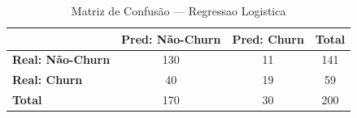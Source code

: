 \begin{table}[htbp]
\centering
\caption{Matriz de Confusão — Regressao Logistica}
\label{tab:matriz}
\small
\begin{tabular}{lcc|c}
\toprule
& \textbf{Pred: Não-Churn} & \textbf{Pred: Churn} & \textbf{Total} \\
\midrule
\textbf{Real: Não-Churn} & 130 & 11 & 141 \\
\textbf{Real: Churn} & 40 & 19 & 59 \\
\midrule
\textbf{Total} & 170 & 30 & 200 \\
\bottomrule
\end{tabular}
\vspace{2mm}
\end{table}